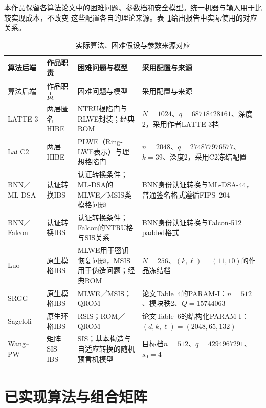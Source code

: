 本作品保留各算法论文中的困难问题、参数档和安全模型。统一机器与输入用于比较实现成本，不改变
这些配置各自的理论来源。表~\ref{tab:assumption-source-map}给出报告中实际使用的对应关系。

\begin{longtable}{@{}>{\raggedright\arraybackslash}p{}>{\raggedright\arraybackslash}p{}>{\raggedright\arraybackslash}p{}>{\raggedright\arraybackslash}p{}@{}}
\caption{实际算法、困难假设与参数来源对应}\label{tab:assumption-source-map}\\
\toprule
\rowcolor{black!8} 算法后端 & 作品职责 & 困难问题与模型 & 采用配置与来源 \\
\midrule
\endfirsthead
\toprule
\rowcolor{black!8} 算法后端 & 作品职责 & 困难问题与模型 & 采用配置与来源 \\
\midrule
\endhead
LATTE-3 & 两层匿名HIBE & NTRU根陷门与RLWE封装；经典ROM & $N=1024$、$q=68718428161$、深度2，采用作者LATTE-3档\cite{zhao2024latte} \\
Lai C2 & 两层HIBE & PLWE（Ring-LWE表示）与理想格陷门 & $n=2048$、$q=274877976577$、$k=39$、深度2，采用C2冻结配置\cite{lai2015trapdoors} \\
BNN／ML-DSA & 认证转换IBS & 认证转换条件；ML-DSA的MLWE／MSIS类模格问题 & BNN身份认证转换与ML-DSA-44，普通签名格式遵循FIPS~204\cite{galindo2006ibs,nist2024fips204} \\
BNN／Falcon & 认证转换IBS & 认证转换条件；Falcon的NTRU格与SIS关系 & BNN身份认证转换与Falcon-512 padded格式\cite{galindo2006ibs,falcon2020} \\
Luo & 原生模格IBS & MLWE用于密钥恢复问题，MSIS用于伪造问题；经典ROM & $N=256$、$(k,\ell)=(11,10)$的作品冻结档\cite{luo2024ibs} \\
SRGG & 原生模格IBS & MLWE／MSIS；QROM & 论文Table~4的PARAM-I：$n=512$、模块秩2、$Q=15744063$\cite{jia2025ibs} \\
Sageloli & 原生环格IBS & RSIS；ROM／QROM & 论文Table~6的结构化PARAM-I：$(d,k,\ell)=(2048,65,132)$\cite{sageloli2023ibs} \\
Wang--PW & 矩阵SIS IBS & SIS；基本构造与自适应转换的随机预言机模型 & 目标档$n=512$、$q=4294967291$、$s_0=4$\cite{wang2024ibme,pan2021ibs} \\
\bottomrule
\end{longtable}

\section{已实现算法与组合矩阵}

